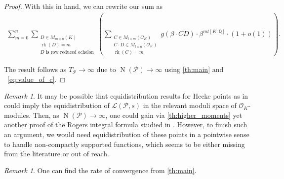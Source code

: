 \documentclass{amsart}
\theoremstyle{definition}
\theoremstyle{remark}
\newtheorem{remark}[theorem]{Remark}
\newcommand{\OK}{\mathcal{O}_K}
\DeclareMathOperator{\ML}{Mod}
\DeclareMathOperator{\rank}{rk}
\DeclareMathOperator{\N}{N}
\begin{document}
\begin{proof}
        With this in hand, we can rewrite our sum as 
        \begin{align}
            \sum_{m=0}^{{n}}\sum_{\substack{D \in M_{m \times n }(K) \\ 
                    \rank(D) = m \\ 
            D \text{ is row reduced echelon}}}
            \left(
                \sum_{\substack{C \in M_{t \times m }(\mathcal{O}_K)  \\ C\cdot D \in M_{t \times n}(\mathcal{O}_K) \\ \rank(C) = m  }}
            {  g( \beta \cdot C  D)}\cdot { \beta^{mt[K:\mathbb{Q}]} } \cdot (1+o(1)) \right).
        \end{align}

    \fi
    The result follows as $T_{\mathcal{P}} \rightarrow \infty$ due to $\N(\mathcal{P}) \rightarrow  \infty$ using \cref{th:main} and ~\cref{eq:value_of_c}.
\end{proof}

\begin{remark}
    It may be possible that equidistribution results for Hecke points as in \cite{EOL01} could imply the equidistribution of $\mathcal{L}(\mathcal{P},s)$ in the relevant moduli space of $\OK$-modules. 
    Then, as $\N(\mathcal{P}) \rightarrow \infty$, one could gain via \cref{th:higher_moments} yet another proof of the Rogers integral formula studied in 
    \cite{K19,  GSV23}. 
    However, to finish such an argument, we would need equidistribution of these points in a pointwise sense to handle non-compactly supported functions, which seems to be either missing from the literature or out of reach.
\end{remark}
\begin{remark}
One can find the rate of convergence from \cref{th:main}.
\end{remark}



 
\end{document}
